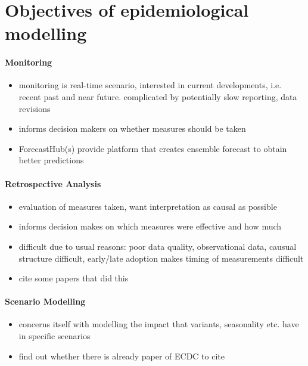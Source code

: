 \section{Objectives of epidemiological modelling}

\paragraph{Monitoring}
\begin{itemize}
    \item monitoring is real-time scenario, interested in current developments, i.e. recent past and near future. complicated by potentially slow reporting, data revisions
    \item informs decision makers on whether measures should be taken
    \item ForecastHub(s) provide platform that creates ensemble forecast to obtain better predictions \cite{Bracher2022National,Bracher2021Preregistered,Ray2020Ensemble,Sherratt2022Predictive}
\end{itemize}
\paragraph{Retrospective Analysis}
\begin{itemize}
    \item evaluation of measures taken, want interpretation as causal as possible
    \item informs decision makes on which measures were effective and how much
    \item difficult due to usual reasons: poor data quality, observational data, causual structure difficult, early/late adoption makes timing of measurements difficult
    \item cite some papers that did this \cite{Flaxman2020Estimating,Brauner2021Inferring,Khazaei2023Using}
\end{itemize}
\paragraph{Scenario Modelling}

\begin{itemize}
    \item concerns itself with modelling the impact that variants, seasonality etc. have in specific scenarios 
    \item find out whether there is already paper of ECDC to cite
\end{itemize}
